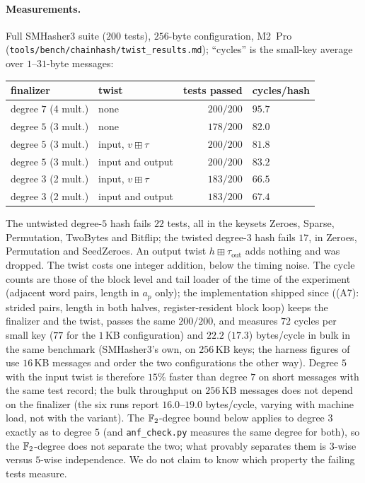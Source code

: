 \paragraph{Measurements.}
Full SMHasher3 suite ($200$ tests), $256$-byte configuration, M2~Pro
(\texttt{tools/bench/chainhash/twist\_results.md}); ``cycles'' is the
small-key average over $1$--$31$-byte messages:
\begin{center}
\begin{tabular}{llrl}
finalizer & twist & tests passed & cycles/hash \\\hline
degree $7$ (4 mult.) & none & $200/200$ & $95.7$ \\
degree $5$ (3 mult.) & none & $178/200$ & $82.0$ \\
degree $5$ (3 mult.) & input, $v\boxplus \tau$ & $200/200$ & $81.8$ \\
degree $5$ (3 mult.) & input and output & $200/200$ & $83.2$ \\
degree $3$ (2 mult.) & input, $v\boxplus \tau$ & $183/200$ & $66.5$ \\
degree $3$ (2 mult.) & input and output & $183/200$ & $67.4$ \\
\end{tabular}
\end{center}
The untwisted degree-$5$ hash fails $22$ tests, all in the keysets Zeroes,
Sparse, Permutation, TwoBytes and Bitflip; the twisted degree-$3$ hash fails
$17$, in Zeroes, Permutation and SeedZeroes.  An output twist $h\boxplus\tau_{\mathrm{out}}$ adds
nothing and was dropped.  The twist costs one integer addition, below the
timing noise.  The cycle counts are those of the block level and tail loader
of the time of the experiment (adjacent word pairs, length in $a_p$ only);
the implementation shipped since ((A7): strided pairs,
length in both halves, register-resident block loop) keeps the finalizer and
the twist, passes the same $200/200$, and measures
$72$ cycles per small key ($77$ for the $1$\,KB configuration) and $22.2$
($17.3$) bytes/cycle in bulk in the same benchmark (SMHasher3's own, on $256$\,KB keys; the harness figures of  use $16$\,KB messages and order the two configurations the other way).  Degree $5$ with the
input twist is therefore $15\%$ faster
than degree $7$ on short messages with the same test record; the bulk
throughput on $256$\,KB messages does not depend on the finalizer (the six
runs report $16.0$--$19.0$ bytes/cycle, varying with machine load, not with
the variant).  The $\mathbb{F}_2$-degree bound below
applies to degree $3$ exactly as to degree $5$ (and \texttt{anf\_check.py}
measures the same degree for both), so the $\mathbb{F}_2$-degree does not separate
the two; what provably separates them is $3$-wise versus $5$-wise
independence.  We do not claim to know which property the failing tests
measure.

